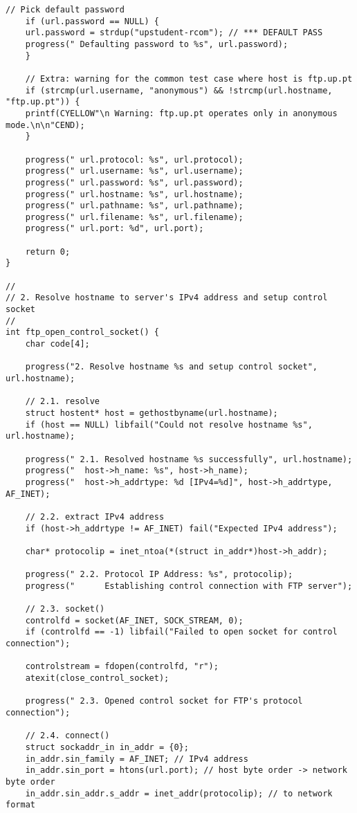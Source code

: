 \documentclass[subfiles]{main.tex}
\begin{document}
\begin{lstlisting}[style=C-sublime]
	// Pick default password
	if (url.password == NULL) {
	url.password = strdup("upstudent-rcom"); // *** DEFAULT PASS
	progress(" Defaulting password to %s", url.password);
	}
	
	// Extra: warning for the common test case where host is ftp.up.pt
	if (strcmp(url.username, "anonymous") && !strcmp(url.hostname, "ftp.up.pt")) {
	printf(CYELLOW"\n Warning: ftp.up.pt operates only in anonymous mode.\n\n"CEND);
	}
	
	progress(" url.protocol: %s", url.protocol);
	progress(" url.username: %s", url.username);
	progress(" url.password: %s", url.password);
	progress(" url.hostname: %s", url.hostname);
	progress(" url.pathname: %s", url.pathname);
	progress(" url.filename: %s", url.filename);
	progress(" url.port: %d", url.port);
	
	return 0;
}

//
// 2. Resolve hostname to server's IPv4 address and setup control socket
//
int ftp_open_control_socket() {
	char code[4];
	
	progress("2. Resolve hostname %s and setup control socket", url.hostname);
	
	// 2.1. resolve
	struct hostent* host = gethostbyname(url.hostname);
	if (host == NULL) libfail("Could not resolve hostname %s", url.hostname);
	
	progress(" 2.1. Resolved hostname %s successfully", url.hostname);
	progress("  host->h_name: %s", host->h_name);
	progress("  host->h_addrtype: %d [IPv4=%d]", host->h_addrtype, AF_INET);
	
	// 2.2. extract IPv4 address
	if (host->h_addrtype != AF_INET) fail("Expected IPv4 address");
	
	char* protocolip = inet_ntoa(*(struct in_addr*)host->h_addr);
	
	progress(" 2.2. Protocol IP Address: %s", protocolip);
	progress("      Establishing control connection with FTP server");
	
	// 2.3. socket()
	controlfd = socket(AF_INET, SOCK_STREAM, 0);
	if (controlfd == -1) libfail("Failed to open socket for control connection");
	
	controlstream = fdopen(controlfd, "r");
	atexit(close_control_socket);
	
	progress(" 2.3. Opened control socket for FTP's protocol connection");
	
	// 2.4. connect()
	struct sockaddr_in in_addr = {0};
	in_addr.sin_family = AF_INET; // IPv4 address
	in_addr.sin_port = htons(url.port); // host byte order -> network byte order
	in_addr.sin_addr.s_addr = inet_addr(protocolip); // to network format
	

\end{lstlisting}
\end{document}
